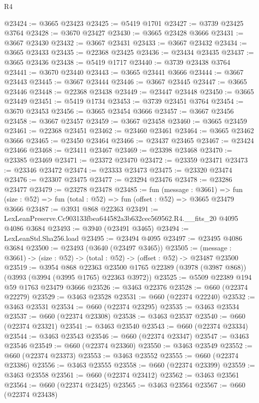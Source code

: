 \begin{lexlean}{R4}
\begin{coremodule}
@23424 := @3665 @23423
@23425 := @5419 @1701
@23427 := @3739 @23425 @3764
@23428 := @3670 @23427
@23430 := @3665 @23428 @3666
@23431 := @3667 @23430
@23432 := @3667 @23431
@23433 := @3667 @23432
@23434 := @3665 @23433
@23435 := @22368 @23425
@23436 := @23434 @23435
@23437 := @3665 @23436
@23438 := @5419 @1717
@23440 := @3739 @23438 @3764
@23441 := @3670 @23440
@23443 := @3665 @23441 @3666
@23444 := @3667 @23443
@23445 := @3667 @23444
@23446 := @3667 @23445
@23447 := @3665 @23446
@23448 := @22368 @23438
@23449 := @23447 @23448
@23450 := @3665 @23449
@23451 := @5419 @1734
@23453 := @3739 @23451 @3764
@23454 := @3670 @23453
@23456 := @3665 @23454 @3666
@23457 := @3667 @23456
@23458 := @3667 @23457
@23459 := @3667 @23458
@23460 := @3665 @23459
@23461 := @22368 @23451
@23462 := @23460 @23461
@23464 := @3665 @23462 @3666
@23465 := @23450 @23464
@23466 := @23437 @23465
@23467 := @23424 @23466
@23468 := @23411 @23467
@23469 := @23398 @23468
@23470 := @23385 @23469
@23471 := @23372 @23470
@23472 := @23359 @23471
@23473 := @23346 @23472
@23474 := @23333 @23473
@23475 := @23320 @23474
@23476 := @23307 @23475
@23477 := @23294 @23476
@23478 := @23286 @23477
@23479 := @23278 @23478
@23485 := fun (message : @3661) =>
  fun (size : @52) => fun (total : @52) => fun (offset : @52) => @3665 @23479 @3666
@23487 := @3931 @868 @22363
@23491 := LexLeanPreserve.Cc903133fbea644582a3b632cec569562.R4.__fits_20 @4095 @4086 @3684
@23493 := @3940 (@23491 @3465)
@23494 := LexLeanStd.Sha256.load
@23495 := @23494 @4095
@23497 := @23495 @4086 @3684
@23500 := @23493 (@3640 (@23497 @3465))
@23505 := (message : @3661) -> (size : @52) -> (total : @52) -> (offset : @52) -> @23487 @23500
@23519 := @3954
    @868
    @22363
    @23500
    @1765
    @22389
    (@3978 (@3987 @868))
    (@3993 (@3994 (@3995 @1765) @22363 @3972))
@23525 := @5509 @22389 @194 @59 @1763 @23479 @3666
@23526 := @3463 @22376
@23528 := @660 (@22374 @22279)
@23529 := @3463 @23528
@23531 := @660 (@22374 @22240)
@23532 := @3463 @23531
@23534 := @660 (@22374 @23295)
@23535 := @3463 @23534
@23537 := @660 (@22374 @23308)
@23538 := @3463 @23537
@23540 := @660 (@22374 @23321)
@23541 := @3463 @23540
@23543 := @660 (@22374 @23334)
@23544 := @3463 @23543
@23546 := @660 (@22374 @23347)
@23547 := @3463 @23546
@23549 := @660 (@22374 @23360)
@23550 := @3463 @23549
@23552 := @660 (@22374 @23373)
@23553 := @3463 @23552
@23555 := @660 (@22374 @23386)
@23556 := @3463 @23555
@23558 := @660 (@22374 @23399)
@23559 := @3463 @23558
@23561 := @660 (@22374 @23412)
@23562 := @3463 @23561
@23564 := @660 (@22374 @23425)
@23565 := @3463 @23564
@23567 := @660 (@22374 @23438)

\end{coremodule}
\end{lexlean}

